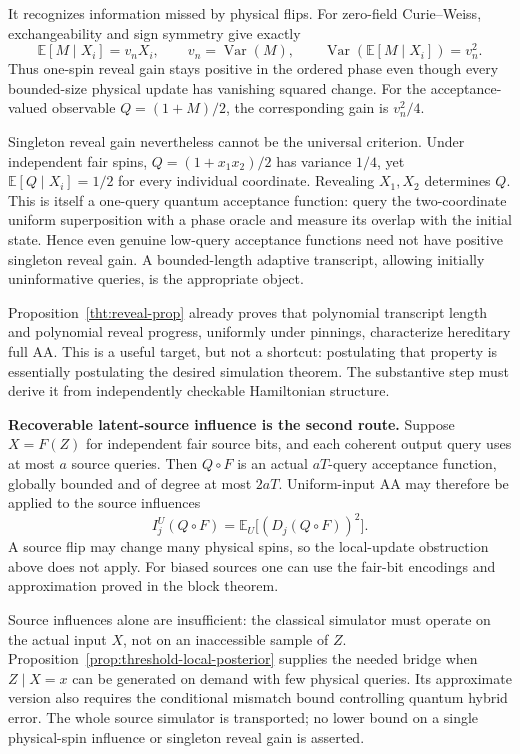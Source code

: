 It recognizes information missed by physical flips. For zero-field
Curie--Weiss, exchangeability and sign symmetry give exactly
\[
 \mathbb E[M\mid X_i]=v_nX_i,\qquad
 v_n=\operatorname{Var}(M),\qquad
 \operatorname{Var}(\mathbb E[M\mid X_i])=v_n^2.
\]
Thus one-spin reveal gain stays positive in the ordered phase even
though every bounded-size physical update has vanishing squared
change. For the acceptance-valued observable \(Q=(1+M)/2\), the
corresponding gain is \(v_n^2/4\).

Singleton reveal gain nevertheless cannot be the universal criterion.
Under independent fair spins,
\(Q=(1+x_1x_2)/2\) has variance \(1/4\), yet
\(\mathbb E[Q\mid X_i]=1/2\) for every individual coordinate.
Revealing \(X_1,X_2\) determines \(Q\). This is itself a one-query
quantum acceptance function: query the two-coordinate uniform
superposition with a phase oracle and measure its overlap with the
initial state. Hence even genuine low-query acceptance functions need
not have positive singleton reveal gain. A bounded-length adaptive
transcript, allowing initially uninformative queries, is the appropriate
object.

Proposition~\ref{tht:reveal-prop} already proves that polynomial
transcript length and polynomial reveal progress, uniformly under
pinnings, characterize hereditary full AA. This is a useful target,
but not a shortcut: postulating that property is essentially postulating
the desired simulation theorem. The substantive step must derive it
from independently checkable Hamiltonian structure.

\textbf{Recoverable latent-source influence is the second route.}
Suppose \(X=F(Z)\) for independent fair source bits, and each coherent
output query uses at most \(a\) source queries. Then \(Q\circ F\)
is an actual \(aT\)-query acceptance function, globally bounded and of
degree at most \(2aT\). Uniform-input AA may therefore be applied to
the source influences
\[
 I_j^{U}(Q\circ F)=\mathbb E_U\bigl[(D_j(Q\circ F))^2\bigr].
\]
A source flip may change many physical spins, so the local-update
obstruction above does not apply. For biased sources one can use the
fair-bit encodings and approximation proved in the block theorem.

Source influences alone are insufficient: the classical simulator
must operate on the actual input \(X\), not on an inaccessible sample
of \(Z\). Proposition~\ref{prop:threshold-local-posterior} supplies
the needed bridge when \(Z\mid X=x\) can be generated on demand with
few physical queries. Its approximate version also requires the
conditional mismatch bound controlling quantum hybrid error. The
whole source simulator is transported; no lower bound on a single
physical-spin influence or singleton reveal gain is asserted.

